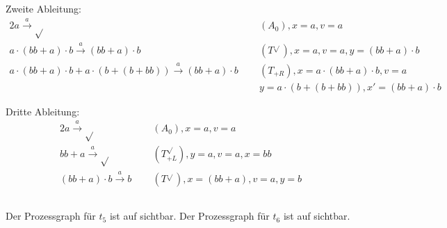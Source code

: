 \documentclass[10pt,a4paper,oneside,ngerman,numbers=noenddot]{scrartcl}
\begin{document}
    Zweite Ableitung:
    \begin{alignat*}{2}
        a \overset{a}{\rightarrow} \sqrt{} \;&&\; (A_0), x = a, v = a \\
        a \cdot (bb + a) \cdot b \overset{a}{\rightarrow} (bb + a) \cdot b \;&&\; (T^{\sqrt{}}), x = a, v = a, y = (bb + a) \cdot b \\
        a \cdot (bb + a) \cdot b + a \cdot (b + (b + bb)) \overset{a}{\rightarrow} (bb + a) \cdot b \;&&\; (T_{+R}), x = a \cdot (bb + a) \cdot b, v = a \\
        &&\; y = a \cdot (b + (b + bb)), x' = (bb + a) \cdot b
    \end{alignat*}

    Dritte Ableitung:
    \begin{alignat*}{2}
        a \overset{a}{\rightarrow} \sqrt{} \;&&\; (A_0), x = a, v = a \\
        bb + a \overset{a}{\rightarrow} \sqrt{} \;&&\; (T^{\sqrt{}}_{+L}), y = a, v = a, x = bb \\
        (bb + a) \cdot b \overset{a}{\rightarrow} b \;&&\; (T^{\sqrt{}}), x = (bb + a), v = a, y = b
    \end{alignat*}

    \subsection{}
    Der Prozessgraph für \(t_5\) ist auf  sichtbar. Der Prozessgraph für \(t_6\) ist auf  sichtbar.
\end{document}
